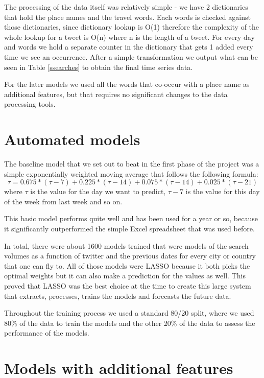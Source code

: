 \documentclass[minf,twoside,singlespacing,parskip,notimes,deptreport]{infthesis} %
\begin{document}
 The processing of the data itself was relatively simple - we have 2 dictionaries that hold the place names and the travel words. Each words is checked against those dictionaries, since dictionary lookup is O(1) therefore the complexity of the whole lookup for a tweet is O(n) where n is the length of a tweet. For every day and words we hold a separate counter in the dictionary that gets 1 added every time we see an occurrence. After a simple transformation we output what can be seen in Table \ref{ssearches} to obtain the final time series data. 
 
 For the later models we used all the words that co-occur with a place name as additional features, but that requires no significant changes to the data processing tools. 


\section{Automated models}

The baseline model that we set out to beat in the first phase of the project was a simple exponentially weighted moving average that follows the following formula:
\begin{equation}
\tau=0.675*(\tau-7) + 0.225*(\tau-14) + 0.075*(\tau-14) + 0.025*(\tau-21)
\end{equation}
where $\tau$ is the value for the day we want to predict, $\tau-7$ is the value for this day of the week from last week and so on.

This basic model performs quite well and has been used for a year or so, because it significantly outperformed the simple Excel spreadsheet that was used before. 

In total, there were about 1600 models trained that were models of the search volumes as a function of twitter and the previous dates for every city or country that one can fly to. All of those models were LASSO because it both picks the optimal weights but it can also make a prediction for the values as well. This proved that LASSO was the best choice at the time to create this large system that extracts, processes, trains the models and forecasts the future data. 

Throughout the training process we used a standard 80/20 split, where we used 80\% of the data to train the models and the other 20\% of the data to assess the performance of the models. 

\section{Models with additional features}
\end{document}
